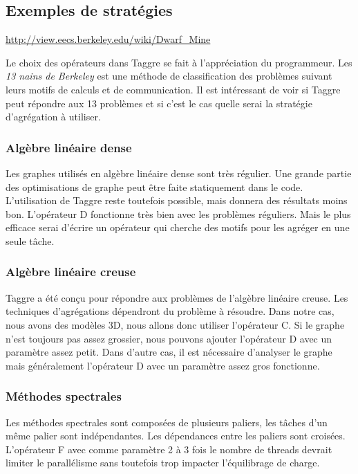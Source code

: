 \subsection{Exemples de stratégies}
\url{http://view.eecs.berkeley.edu/wiki/Dwarf_Mine}

Le choix des opérateurs dans Taggre se fait à l'appréciation du programmeur.
%
Les {\em 13 nains de Berkeley} est une méthode de classification des problèmes suivant leurs motifs de calculs et de communication.
%
Il est intéressant de voir si Taggre peut répondre aux 13 problèmes et si c'est le cas quelle serai la stratégie d'agrégation à utiliser.

\subsubsection{Algèbre linéaire dense}
Les graphes utilisés en algèbre linéaire dense sont très régulier.
%
Une grande partie des optimisations de graphe peut être faite statiquement dans le code.
%
L'utilisation de Taggre reste toutefois possible, mais donnera des résultats moins bon.
%
L'opérateur D fonctionne très bien avec les problèmes réguliers.
%
Mais le plus efficace serai d'écrire un opérateur qui cherche des motifs pour les agréger en une seule tâche.


\subsubsection{Algèbre linéaire creuse}
Taggre a été conçu pour répondre aux problèmes de l'algèbre linéaire creuse.
%
Les techniques d'agrégations dépendront du problème à résoudre.
%
Dans notre cas, nous avons des modèles 3D, nous allons donc utiliser l'opérateur C.
%
Si le graphe n'est toujours pas assez grossier, nous pouvons ajouter l'opérateur D avec un paramètre assez petit.
%
Dans d'autre cas, il est nécessaire d'analyser le graphe mais généralement l'opérateur D avec un paramètre assez gros fonctionne.



\subsubsection{Méthodes spectrales}
Les méthodes spectrales sont composées de plusieurs paliers, les tâches d'un même palier sont indépendantes.
%
Les dépendances entre les paliers sont croisées.
%
L'opérateur F avec comme paramètre 2 à 3 fois le nombre de threads devrait limiter le parallélisme sans toutefois trop impacter l'équilibrage de charge.



